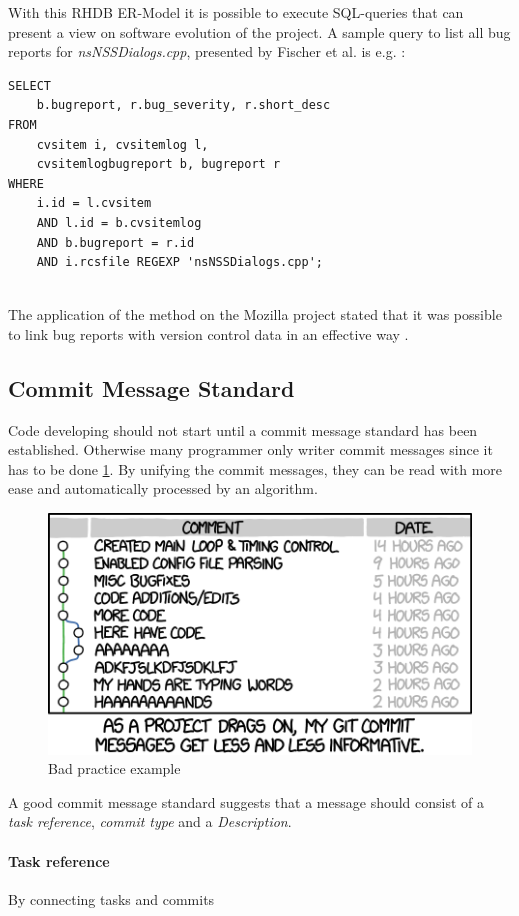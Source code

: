 With this RHDB ER-Model it is possible to execute SQL-queries that can present a view on software evolution of the project. A sample query to list all bug reports for \textit{nsNSSDialogs.cpp}, presented by Fischer et al. is e.g. \cite{fischer2003populating}:

\begin{verbatim}
SELECT
	b.bugreport, r.bug_severity, r.short_desc
FROM
	cvsitem i, cvsitemlog l,
	cvsitemlogbugreport b, bugreport r
WHERE 	
	i.id = l.cvsitem
	AND l.id = b.cvsitemlog
	AND b.bugreport = r.id
	AND i.rcsfile REGEXP 'nsNSSDialogs.cpp';
	
\end{verbatim}

The application of the method on the Mozilla project stated that it was possible to link bug reports with version control data in an effective way \cite{fischer2003populating}. 

\subsection{Commit Message Standard}
Code developing should not start until a commit message standard has been established. Otherwise many programmer only writer commit messages since it has to be done \ref{git_commit}. By unifying the commit messages, they can be read with more ease and automatically processed by an algorithm. \\
\begin{figure}[ht]
\includegraphics[scale=0.6]{images/git_commit.png}
\caption{Bad practice example}
\label{git_commit}
\end{figure}
A good commit message standard suggests that a message should consist of a \textit{task reference}, \textit{commit type} and a \textit{Description}.\\ 
\paragraph{Task reference}
By connecting tasks and commits 
